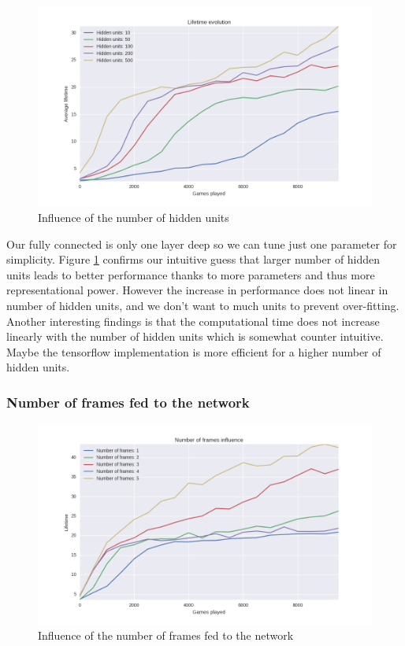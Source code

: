 \documentclass{article}
\begin{document}
\begin{figure}[!htbp]
\centering
  \includegraphics[width=.8\linewidth]{hidden_units_dependence.png}
  \caption{Influence of the number of hidden units}
  \label{hidden_units}
\end{figure}

Our fully connected is only one layer deep so we can tune just one parameter for simplicity.
Figure \ref{hidden_units} confirms our intuitive guess that larger number of hidden units leads to better performance thanks to more parameters and thus more representational power.
However the increase in performance does not linear in number of hidden units, and we don't want to much units to prevent over-fitting.
Another interesting findings is that the computational time does not increase linearly with the number of hidden units which is somewhat counter intuitive. Maybe the tensorflow implementation is more efficient for a higher number of hidden units.

\subsubsection*{Number of frames fed to the network}

\begin{figure}[b]
\centering
  \includegraphics[width=.8\linewidth]{number_of_frames_dependence.png}
  \caption{Influence of the number of frames fed to the network}
  \label{number_of_frames}
\end{figure}
\end{document}
